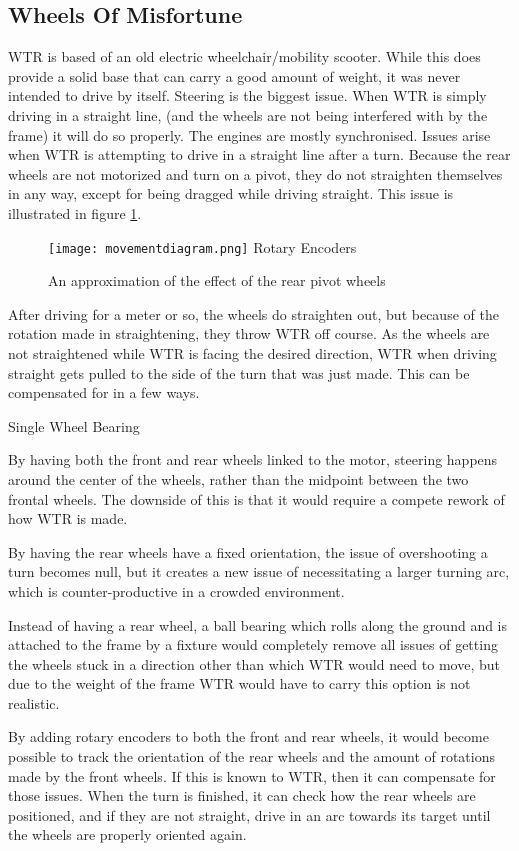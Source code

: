 \subsection{Wheels Of Misfortune}
WTR is based of an old electric wheelchair/mobility scooter.
While this does provide a solid base that can carry a good amount of weight, it was never intended to drive by itself.
Steering is the biggest issue.
When WTR is simply driving in a straight line, (and the wheels are not being interfered with by the frame) it will do so properly.
The engines are mostly synchronised.
Issues arise when WTR is attempting to drive in a straight line after a turn.
Because the rear wheels are not motorized and turn on a pivot, they do not straighten themselves in any way, except for being dragged while driving straight.
This issue is illustrated in figure \ref{fig::mvmnt}.
\begin{figure}[H]
\texttt{[image: movementdiagram.png]}
\label{fig::mvmnt}{Rotary Encoders}
\caption{An approximation of the effect of the rear pivot wheels}
\end{figure}
After driving for a meter or so, the wheels do straighten out, but because of the rotation made in straightening, they throw WTR off course.
As the wheels are not straightened while WTR is facing the desired direction, WTR when driving straight gets pulled to the side of the turn that was just made.
This can be compensated for in a few ways.

\begin{labeling}{Single Wheel Bearing}
\item [Tank Controls] By having both the front and rear wheels linked to the motor, steering happens around the center of the wheels, rather than the midpoint between the two frontal wheels. The downside of this is that it would require a compete rework of how WTR is made.
\item [Fixed Rear Wheels] By having the rear wheels have a fixed orientation, the issue of overshooting a turn becomes null, but it creates a new issue of necessitating a larger turning arc, which is counter-productive in a crowded environment.
\item [Single Wheel Bearing] Instead of having a rear wheel, a ball bearing which rolls along the ground and is attached to the frame by a fixture would completely remove all issues of getting the wheels stuck in a direction other than which WTR would need to move, but due to the weight of the frame WTR would have to carry this option is not realistic.
\item [Rotary Encoders] By adding rotary encoders to both the front and rear wheels, it would become possible to track the orientation of the rear wheels and the amount of rotations made by the front wheels. If this is known to WTR, then it can compensate for those issues. When the turn is finished, it can check how the rear wheels are positioned, and if they are not straight, drive in an arc towards its target until the wheels are properly oriented again. 
\end{labeling}
\newpage
